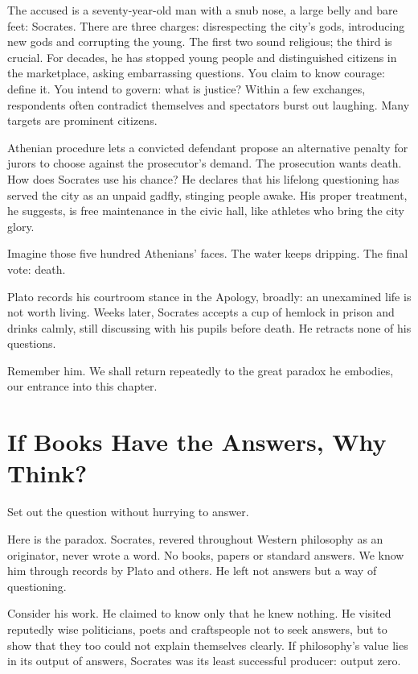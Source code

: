 The accused is a seventy-year-old man with a snub nose, a large belly and bare feet: Socrates. There are three charges: disrespecting the city's gods, introducing new gods and corrupting the young. The first two sound religious; the third is crucial. For decades, he has stopped young people and distinguished citizens in the marketplace, asking embarrassing questions. You claim to know courage: define it. You intend to govern: what is justice? Within a few exchanges, respondents often contradict themselves and spectators burst out laughing. Many targets are prominent citizens.

Athenian procedure lets a convicted defendant propose an alternative penalty for jurors to choose against the prosecutor's demand. The prosecution wants death. How does Socrates use his chance? He declares that his lifelong questioning has served the city as an unpaid gadfly, stinging people awake. His proper treatment, he suggests, is free maintenance in the civic hall, like athletes who bring the city glory.

Imagine those five hundred Athenians' faces. The water keeps dripping. The final vote: death.

Plato records his courtroom stance in the Apology, broadly: an unexamined life is not worth living. Weeks later, Socrates accepts a cup of hemlock in prison and drinks calmly, still discussing with his pupils before death. He retracts none of his questions.

Remember him. We shall return repeatedly to the great paradox he embodies, our entrance into this chapter.

\section{If Books Have the Answers, Why Think?}
Set out the question without hurrying to answer.

Here is the paradox. Socrates, revered throughout Western philosophy as an originator, never wrote a word. No books, papers or standard answers. We know him through records by Plato and others. He left not answers but a way of questioning.

Consider his work. He claimed to know only that he knew nothing. He visited reputedly wise politicians, poets and craftspeople not to seek answers, but to show that they too could not explain themselves clearly. If philosophy's value lies in its output of answers, Socrates was its least successful producer: output zero.

